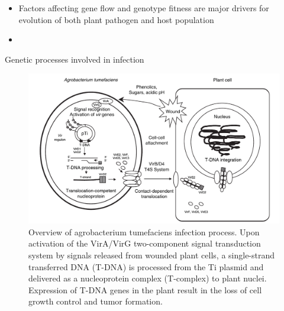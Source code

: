\documentclass[11pt,dvipsnames,ignorenonframetext,aspectratio=169]{beamer}
\providecommand{\tightlist}{%
  \setlength{\itemsep}{0pt}\setlength{\parskip}{0pt}}
\newcommand{\ecolumns}{\end{columns}}
\begin{document}

\begin{frame}{}
\protect\hypertarget{section-4}{}
\begin{itemize}
\tightlist
\item
  Factors affecting gene flow and genotype fitness are major drivers for
  evolution of both plant pathogen and host population
\item
\end{itemize}
\end{frame}

\begin{frame}{Genetic processes involved in infection}
\protect\hypertarget{genetic-processes-involved-in-infection}{}
\begin{figure}

{\centering \includegraphics[width=0.66\linewidth]{../images/agrobacterium-transformation} 

}

\caption{Overview of agrobacterium tumefaciens infection process. Upon activation of the VirA/VirG two-component signal transduction system by signals released from wounded plant cells, a single-strand transferred DNA (T-DNA) is processed from the Ti plasmid and delivered as a nucleoprotein complex (T-complex) to plant nuclei. Expression of T-DNA genes in the plant result in the loss of cell growth control and tumor formation.}\label{fig:mechanism-of-infection}
\end{figure}
\end{frame}
\end{document}
